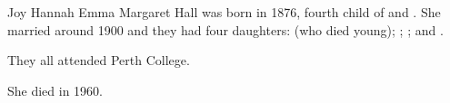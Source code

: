 
Joy Hannah Emma Margaret Hall was born in 1876, fourth child of  and .
She married  around 1900 and they had four daughters:
 (who died young);
;
; and
.

They all attended Perth College.\cite{WestAusSocialNotes1913}

She died in 1960.
